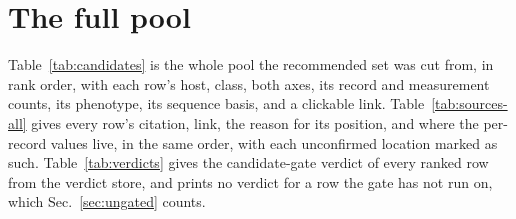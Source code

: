 
\clearpage
\section{The full pool}\label{sec:full}

Table~\ref{tab:candidates} is the whole pool the recommended set was cut from, in rank order,
with each row's host, class, both axes, its record and measurement counts, its phenotype, its
sequence basis, and a clickable link. Table~\ref{tab:sources-all} gives every row's citation, link, the
reason for its position, and where the per-record values live, in the same order, with each
unconfirmed location marked as such. Table~\ref{tab:verdicts} gives the candidate-gate verdict
of every ranked row from the verdict store, and prints no verdict for a row the gate has not
run on, which Sec.~\ref{sec:ungated} counts.



\clearpage


\clearpage

